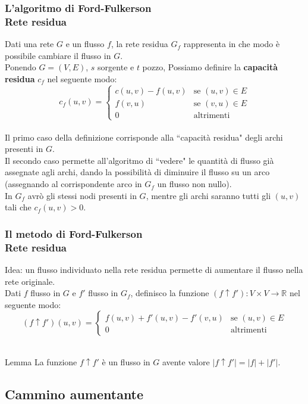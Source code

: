 \documentclass{beamer}
\begin{document}
\begin{frame}
\frametitle{L'algoritmo di Ford-Fulkerson\\Rete residua}
Dati una rete $G$ e un flusso $f$, la rete residua $G_f$ rappresenta in che modo è possibile cambiare il flusso in $G$.\\
Ponendo $G=(V,E)$, $s$ sorgente e $t$ pozzo, Possiamo definire la \textbf{capacità residua} $c_f$ nel seguente modo:\\
$$c_f(u,v) =
\left\{
	\begin{array}{ll}
		c(u,v)-f(u,v)  & \mbox{se } (u,v)\in E \\
		f(v,u) & \mbox{se } (v,u)\in E \\
		0 & \mbox{altrimenti}
	\end{array}
\right.$$\\
Il primo caso della definizione corrisponde alla ``capacità residua" degli archi presenti in $G$.\\
Il secondo caso permette all'algoritmo di ``vedere" le quantità di flusso già assegnate agli archi, dando la possibilità di diminuire il flusso su un arco (assegnando al corrispondente arco in $G_f$ un flusso non nullo).\\
In $G_f$ avrò gli stessi nodi presenti in $G$, mentre gli archi saranno tutti gli $(u,v)$ tali che $c_f(u,v)>0$.
\end{frame}

\begin{frame}
\frametitle{Il metodo di Ford-Fulkerson\\Rete residua}
Idea: un flusso individuato nella rete residua permette di aumentare il flusso nella rete originale.\\
Dati $f$ flusso in $G$ e $f'$ flusso in $G_f$, definisco la funzione $(f\uparrow f'):V\times V\rightarrow \mathbb{R}$ nel seguente modo:\\
$$(f\uparrow f')(u,v) =
\left\{
	\begin{array}{ll}
		f(u,v)+f'(u,v)-f'(v,u) & \mbox{se } (u,v)\in E \\
		0 & \mbox{altrimenti}
	\end{array}
\right.$$\\
\begin{block}{Lemma}
La funzione $f\uparrow f'$ è un flusso in $G$ avente valore $|f\uparrow f'|=|f|+|f'|$.
\end{block}
\end{frame}

\subsection{Cammino aumentante}
\end{document}
